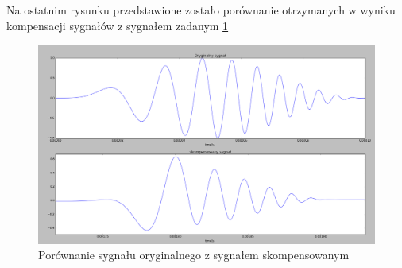 Na ostatnim rysunku przedstawione zostało porównanie otrzymanych w wyniku kompensacji sygnałów z sygnałem zadanym \ref{fig:przedipo2}
\begin{figure}[h]
\centering
\includegraphics[width=13cm]{Zdjecia/4/przedipo2}
\caption{Porównanie sygnału oryginalnego z sygnałem skompensowanym}
\label{fig:przedipo2}
\end{figure}

